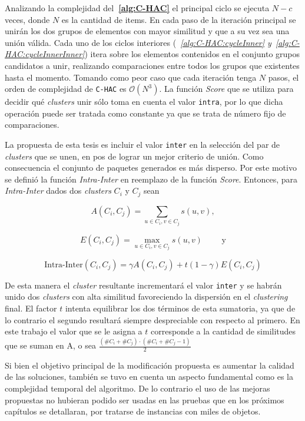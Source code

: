 Analizando la complejidad del\textbf{~\autoref{alg:C-HAC}} el principal ciclo se ejecuta $N - c$ veces, donde $N$ es la cantidad de items. En cada paso de la iteración principal se unirán los dos grupos de elementos con mayor similitud y que a su vez sea una unión válida. Cada uno de los ciclos interiores (\textit{~\autoref{alg:C-HAC:cycleInner} y~\autoref{alg:C-HAC:cycleInnerInner}}) itera sobre los elementos contenidos en el conjunto grupos candidatos a unir, realizando comparaciones entre todos los grupos que existentes hasta el momento. Tomando como peor caso que cada iteración tenga $N$ pasos, el orden de complejidad de \texttt{C-HAC} es $\mathcal{O}(N^{3})$. La función \textit{Score} que se utiliza para decidir qué {\em clusters} unir sólo toma en cuenta el valor \texttt{intra}, por lo que dicha operación puede ser tratada como constante ya que se trata de número fijo de comparaciones.

La propuesta de esta tesis es incluir el valor \texttt{inter} en la selección del par de {\em clusters} que se unen, en pos de lograr un mejor criterio de unión. Como consecuencia el conjunto de paquetes generados es más disperso. Por este motivo se definió la función \textit{Intra-Inter} en reemplazo de la función \textit{Score}. Entonces, para \textit{Intra-Inter} dados dos {\em clusters} $C_i$ y $C_j$ sean

$$A(C_i,C_j) = \sum_{u \in C_i, v \in C_j}{s(u,v)},$$

$$E(C_i,C_j)=\max_{u \in C_i, v \in C_j}{s(u,v)} \qquad \mbox{ y}$$

$$\mbox{Intra-Inter}(C_i,C_j) = \gamma A(C_i,C_j) + t (1-\gamma) E(C_i,C_j)$$

De esta manera el {\em cluster} resultante incrementará el valor \texttt{inter} y se habrán unido dos {\em clusters} con alta similitud favoreciendo la dispersión en el {\em clustering} final. El factor $t$ intenta equilibrar los dos términos de esta sumatoria, ya que de lo contrario el segundo resultará siempre despreciable con respecto al primero. En este trabajo el valor que se le asigna a $t$ corresponde a la cantidad de similitudes que se suman en A, o sea $\frac{(\#C_i + \#C_j) \cdot (\#C_i + \#C_j - 1)}{2}$  

Si bien el objetivo principal de la modificación propuesta es aumentar la calidad de las soluciones, también se tuvo en cuenta un aspecto fundamental como es la complejidad temporal del algoritmo. De lo contrario el uso de las mejoras propuestas no hubieran podido ser usadas en las pruebas que en los próximos capítulos se detallaran, por tratarse de instancias con miles de objetos.

